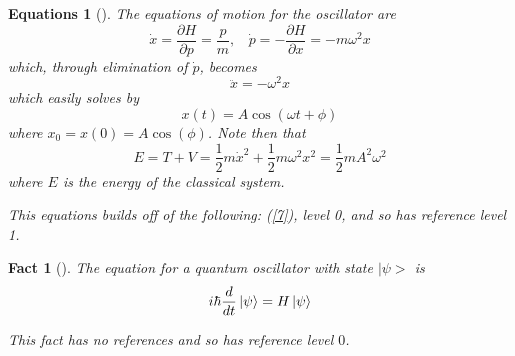 \documentclass{article}
\newtheorem{fact}[definition]{Fact}
\newtheorem{equations}[definition]{Equations}
\begin{document}
\begin{equations}[]\label{13}The equations of motion for the oscillator are $$\dot{x}=
 \frac{\partial H}{\partial p}=\frac{p}{m},~~~~\dot{p}=-\frac{\partial H}{\partial x}=
 -m\omega^2 x$$ which, through elimination of $\dot{p}$, becomes
 $$\ddot{x}=-\omega^2x$$ which easily solves by
 $$x(t)=A\cos(\omega t+\phi)$$ where $x_0=x(0)=A\cos(\phi)$. Note then that
 $$E=T+V=\frac{1}{2}m\dot{x}^2+\frac{1}{2}m\omega^2x^2=\frac{1}{2}mA^2\omega^2$$
 where $E$ is the energy of the classical system.
 
 This equations builds off of the following: (\ref{7}), level 0, and so has reference level 1.\end{equations}
\begin{fact}[]\label{14}The equation for a quantum oscillator with state $|\psi>$ is
 $$i\hbar\frac{d}{dt}\ket{\psi}=H\ket{\psi}$$
 
 This fact has no references and so has reference level $0$.\end{fact}
\end{document}
